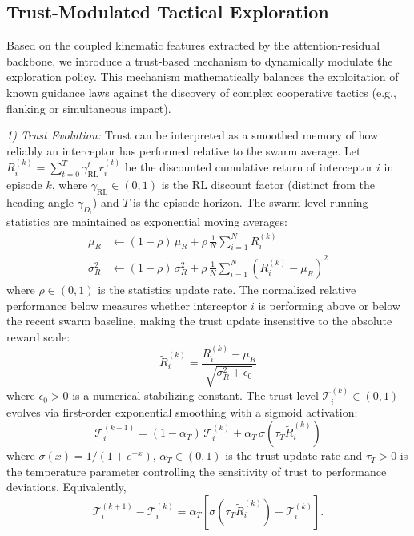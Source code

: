\documentclass[lettersize,journal]{IEEEtran}
\providecommand{\DIFadd}[1]{{\protect\color{blue} #1}} %
\providecommand{\DIFdel}[1]{} %
\providecommand{\DIFaddbegin}{} %
\providecommand{\DIFaddend}{} %
\providecommand{\DIFdelbegin}{} %
\providecommand{\DIFdelend}{} %
\begin{document}
\subsection{Trust-Modulated Tactical Exploration}
\label{subsec:trust_exploration}

Based on the \DIFdelbegin \DIFdel{high-fidelity }\DIFdelend \DIFaddbegin \DIFadd{coupled kinematic }\DIFaddend features extracted by the
attention-residual backbone, we introduce a trust-based mechanism to dynamically
modulate the exploration policy. This mechanism mathematically balances the
exploitation of known guidance laws against the discovery of complex
cooperative tactics (e.g., flanking or simultaneous impact).

\emph{1) Trust Evolution:} Trust can be interpreted as a smoothed memory of how reliably an interceptor has performed relative to the swarm average. Let $R_i^{(k)} = \sum_{t=0}^{T} \gamma_{\mathrm{RL}}^t r_i^{(t)}$ be the discounted cumulative return of interceptor $i$ in episode $k$, where $\gamma_{\mathrm{RL}} \in (0,1)$ is the RL discount factor (distinct from the heading angle $\gamma_{D_i}$) and $T$ is the episode horizon. The swarm-level running statistics are maintained as exponential moving averages:
\begin{align}
\mu_R &\leftarrow (1-\rho)\,\mu_R + \rho\,\frac{1}{N}\sum_{i=1}^{N} R_i^{(k)} \label{eq:running_stats_mu} \\
\sigma_R^2 &\leftarrow (1-\rho)\,\sigma_R^2 + \rho\,\frac{1}{N}\sum_{i=1}^{N}\!\left(R_i^{(k)} - \mu_R\right)^2 \label{eq:running_stats_sigma}
\end{align}
where $\rho \in (0,1)$ is the statistics update rate. The normalized relative performance below measures whether interceptor $i$ is performing above or below the recent swarm baseline, making the trust update insensitive to the absolute reward scale:
\begin{equation}
\label{eq:trust_normalized}
\tilde{R}_i^{(k)} = \frac{R_i^{(k)} - \mu_R}{\sqrt{\sigma_R^2 + \epsilon_0}}
\end{equation}
where $\epsilon_0 > 0$ is a numerical stabilizing constant. The trust level $\mathcal{T}_i^{(k)} \in (0,1)$ evolves via first-order exponential smoothing with a sigmoid activation:
\begin{equation}
\label{eq:trust_evolution}
\mathcal{T}_i^{(k+1)} = (1-\alpha_T)\,\mathcal{T}_i^{(k)} + \alpha_T\,\sigma\!\left(\tau_T \tilde{R}_i^{(k)}\right)
\end{equation}
where $\sigma(x) = 1/(1+e^{-x})$, $\alpha_T \in (0,1)$ is the trust update rate and $\tau_T > 0$ is the temperature parameter controlling the sensitivity of trust to performance deviations. \DIFdelbegin \DIFdel{When $R_i^{(k)} > \mu_R$,
the sigmoid output exceeds 0.5, driving $\mathcal{T}_i$ upward and reducing exploration; conversely, below-average performance lowers $\mathcal{T}_i$ and amplifies exploration}\DIFdelend \DIFaddbegin \DIFadd{Equivalently,
}\begin{equation}
\label{eq:trust_increment}
\mathcal T_i^{(k+1)}-\mathcal T_i^{(k)}
=\alpha_T\!\left[
\sigma(\tau_T\widetilde R_i^{(k)})-\mathcal T_i^{(k)}\right].
\end{equation}
\end{document}
